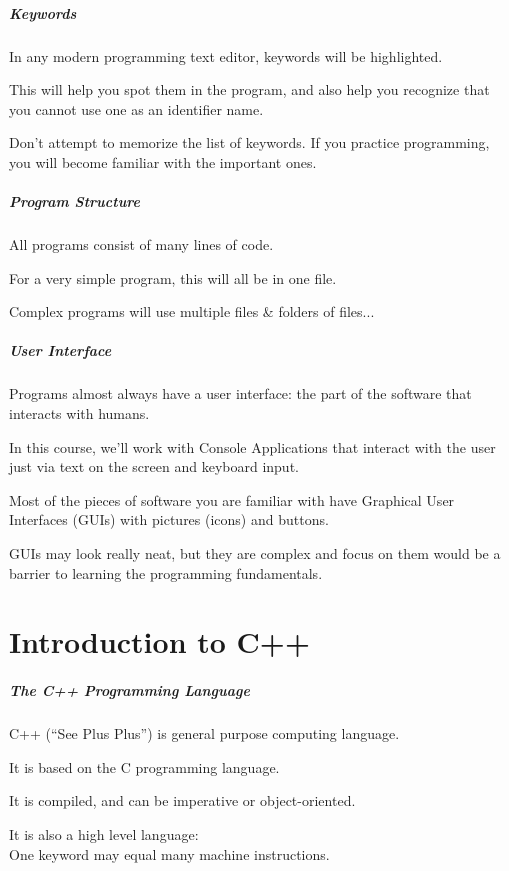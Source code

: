 \begin{frame}
\frametitle{Keywords}

In any modern programming text editor, keywords will be highlighted.

This will help you spot them in the program, and also help you recognize that you cannot use one as an identifier name.

Don't attempt to memorize the list of keywords. If you practice programming, you will become familiar with the important ones.

\end{frame}

\begin{frame}
\frametitle{Program Structure}

All programs consist of many lines of code.

For a very simple program, this will all be in one file.

Complex programs will use multiple files \& folders of files...

\end{frame}

\begin{frame}
\frametitle{User Interface}
Programs almost always have a user interface: the part of the software that interacts with humans.

In this course, we'll work with Console Applications that interact with the user just via text on the screen and keyboard input.

Most of the pieces of software you are familiar with have \alert{Graphical User Interfaces (GUIs)} with pictures (icons) and buttons.

GUIs may look really neat, but they are complex and focus on them would be a barrier to learning the programming fundamentals.

\end{frame}


\part{Introduction to C++}
\begin{frame}\partpage\end{frame}

\begin{frame}
\frametitle{The C++ Programming Language}
\alert{C++} (``See Plus Plus'') is general purpose computing language.

It is based on the C programming language.

It is compiled, and can be imperative or object-oriented.

It is also a \alert{high level language}:\\
\quad\quad One keyword may equal many machine instructions.

\end{frame}


